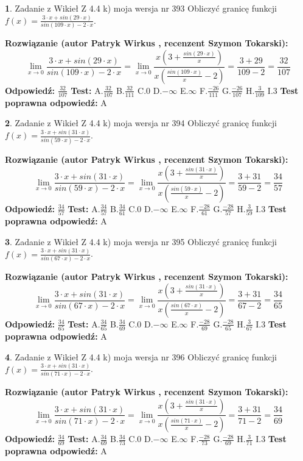\documentclass[12pt, a4paper]{article}
\theoremstyle{definition} %
\newtheorem{zad}{}
\newcommand{\zadStart}[1]{\begin{zad}#1\newline}
\newcommand{\zadStop}{\end{zad}}
\newcommand{\rozwStart}[2]{\noindent \textbf{Rozwiązanie (autor #1 , recenzent #2): }\newline}
\newcommand{\rozwStop}{\newline}
\newcommand{\odpStart}{\noindent \textbf{Odpowiedź:}\newline}
\newcommand{\odpStop}{\newline}
\newcommand{\testStart}{\noindent \textbf{Test:}\newline}
\newcommand{\testStop}{\newline}
\newcommand{\kluczStart}{\noindent \textbf{Test poprawna odpowiedź:}\newline}
\newcommand{\kluczStop}{\newline}
\begin{document}
\zadStart{Zadanie z Wikieł Z 4.4 k) moja wersja nr 393}
Obliczyć granicę funkcji $f(x)=\frac{3\cdot x +sin(29\cdot x)}{sin(109\cdot x) -2\cdot x}$.
\zadStop
\rozwStart{Patryk Wirkus}{Szymon Tokarski}
$$\lim\limits_{x\to 0}\frac{3\cdot x +sin(29\cdot x)}{sin(109\cdot x) -2\cdot x}
=\lim\limits_{x\to 0}\frac{x(3+\frac{sin(29\cdot x)}{x})}{x(\frac{sin(109\cdot x)}{x}-2)}
=\frac{3+29}{109-2} = \frac{32}{107}$$
\rozwStop
\odpStart
$\frac{32}{107}$
\odpStop
\testStart
A.$\frac{32}{107}$
B.$\frac{32}{111}$
C.$0$
D.$-\infty$
E.$\infty$
F.$\frac{-26}{111}$
G.$\frac{-26}{107}$
H.$\frac{3}{109}$
I.$3$
\testStop
\kluczStart
A
\kluczStop



\zadStart{Zadanie z Wikieł Z 4.4 k) moja wersja nr 394}
Obliczyć granicę funkcji $f(x)=\frac{3\cdot x +sin(31\cdot x)}{sin(59\cdot x) -2\cdot x}$.
\zadStop
\rozwStart{Patryk Wirkus}{Szymon Tokarski}
$$\lim\limits_{x\to 0}\frac{3\cdot x +sin(31\cdot x)}{sin(59\cdot x) -2\cdot x}
=\lim\limits_{x\to 0}\frac{x(3+\frac{sin(31\cdot x)}{x})}{x(\frac{sin(59\cdot x)}{x}-2)}
=\frac{3+31}{59-2} = \frac{34}{57}$$
\rozwStop
\odpStart
$\frac{34}{57}$
\odpStop
\testStart
A.$\frac{34}{57}$
B.$\frac{34}{61}$
C.$0$
D.$-\infty$
E.$\infty$
F.$\frac{-28}{61}$
G.$\frac{-28}{57}$
H.$\frac{3}{59}$
I.$3$
\testStop
\kluczStart
A
\kluczStop



\zadStart{Zadanie z Wikieł Z 4.4 k) moja wersja nr 395}
Obliczyć granicę funkcji $f(x)=\frac{3\cdot x +sin(31\cdot x)}{sin(67\cdot x) -2\cdot x}$.
\zadStop
\rozwStart{Patryk Wirkus}{Szymon Tokarski}
$$\lim\limits_{x\to 0}\frac{3\cdot x +sin(31\cdot x)}{sin(67\cdot x) -2\cdot x}
=\lim\limits_{x\to 0}\frac{x(3+\frac{sin(31\cdot x)}{x})}{x(\frac{sin(67\cdot x)}{x}-2)}
=\frac{3+31}{67-2} = \frac{34}{65}$$
\rozwStop
\odpStart
$\frac{34}{65}$
\odpStop
\testStart
A.$\frac{34}{65}$
B.$\frac{34}{69}$
C.$0$
D.$-\infty$
E.$\infty$
F.$\frac{-28}{69}$
G.$\frac{-28}{65}$
H.$\frac{3}{67}$
I.$3$
\testStop
\kluczStart
A
\kluczStop



\zadStart{Zadanie z Wikieł Z 4.4 k) moja wersja nr 396}
Obliczyć granicę funkcji $f(x)=\frac{3\cdot x +sin(31\cdot x)}{sin(71\cdot x) -2\cdot x}$.
\zadStop
\rozwStart{Patryk Wirkus}{Szymon Tokarski}
$$\lim\limits_{x\to 0}\frac{3\cdot x +sin(31\cdot x)}{sin(71\cdot x) -2\cdot x}
=\lim\limits_{x\to 0}\frac{x(3+\frac{sin(31\cdot x)}{x})}{x(\frac{sin(71\cdot x)}{x}-2)}
=\frac{3+31}{71-2} = \frac{34}{69}$$
\rozwStop
\odpStart
$\frac{34}{69}$
\odpStop
\testStart
A.$\frac{34}{69}$
B.$\frac{34}{73}$
C.$0$
D.$-\infty$
E.$\infty$
F.$\frac{-28}{73}$
G.$\frac{-28}{69}$
H.$\frac{3}{71}$
I.$3$
\testStop
\kluczStart
A
\kluczStop
\end{document}
